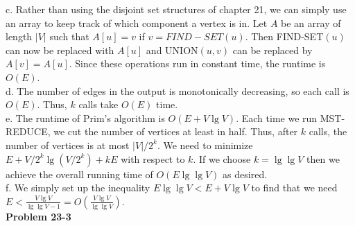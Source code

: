\documentclass{article}
\begin{document}
c. Rather than using the disjoint set structures of chapter 21, we can simply use an array to keep track of which component a vertex is in.  Let $A$ be an array of length $|V|$ such that $A[u] = v$ if $v = FIND-SET(u)$. Then FIND-SET$(u)$ can now be replaced with $A[u]$ and UNION$(u,v)$ can be replaced by $A[v] = A[u]$.  Since these operations run in constant time, the runtime is $O(E)$. \\

d. The number of edges in the output is monotonically decreasing, so each call is $O(E)$. Thus, $k$ calls take $O(E)$ time. \\

e. The runtime of Prim's algorithm is $O(E + V\lg V)$.  Each time we run MST-REDUCE, we cut the number of vertices at least in half.  Thus, after $k$ calls, the number of vertices is at most $|V|/2^k$.  We need to minimize $E + V/2^k\lg(V/2^k) + kE$ with respect to $k$.  If we choose $k = \lg \lg V$ then we achieve the overall running time of $O(E\lg \lg V)$ as desired.  \\


f. We simply set up the inequality $E\lg \lg V < E + V\lg V$ to find that we need $E < \frac{V\lg V}{\lg \lg V - 1} = O\left(\frac{V\lg V}{\lg \lg V}\right)$. \\

\noindent\textbf{Problem 23-3}\\
\end{document}
